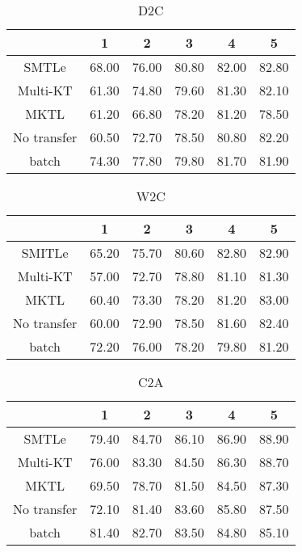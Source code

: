 \begin{table}[htbp]
	\centering
	\caption{D2C}
	\begin{tabular}{cccccc}
		\toprule
		& 1     & 2     & 3     & 4     & 5 \\
		\midrule
		SMTLe & 68.00 & 76.00 & 80.80 & 82.00 & 82.80 \\
		Multi-KT & 61.30 & 74.80 & 79.60 & 81.30 & 82.10 \\
		MKTL  & 61.20 & 66.80 & 78.20 & 81.20 & 78.50 \\
		No transfer & 60.50 & 72.70 & 78.50 & 80.80 & 82.20 \\
		batch & 74.30 & 77.80 & 79.80 & 81.70 & 81.90 \\
		\bottomrule
	\end{tabular}%
\end{table}%
\begin{table}[htbp]
	\centering
	\caption{W2C}
	\begin{tabular}{cccccc}
		\toprule
		& 1     & 2     & 3     & 4     & 5 \\
		\midrule
		SMITLe & 65.20 & 75.70 & 80.60 & 82.80 & 82.90 \\
		Multi-KT & 57.00 & 72.70 & 78.80 & 81.10 & 81.30 \\
		MKTL  & 60.40 & 73.30 & 78.20 & 81.20 & 83.00 \\
		No transfer & 60.00 & 72.90 & 78.50 & 81.60 & 82.40 \\
		batch & 72.20 & 76.00 & 78.20 & 79.80 & 81.20 \\
		\bottomrule
	\end{tabular}%
\end{table}%
\begin{table}[htbp]
	\centering
	\caption{C2A}
	\begin{tabular}{cccccc}
		\toprule
		& 1     & 2     & 3     & 4     & 5 \\
		\midrule
		SMTLe & 79.40 & 84.70 & 86.10 & 86.90 & 88.90 \\
		Multi-KT & 76.00 & 83.30 & 84.50 & 86.30 & 88.70 \\
		MKTL  & 69.50 & 78.70 & 81.50 & 84.50 & 87.30 \\
		No transfer & 72.10 & 81.40 & 83.60 & 85.80 & 87.50 \\
		batch & 81.40 & 82.70 & 83.50 & 84.80 & 85.10 \\
		\bottomrule
	\end{tabular}%
\end{table}%
